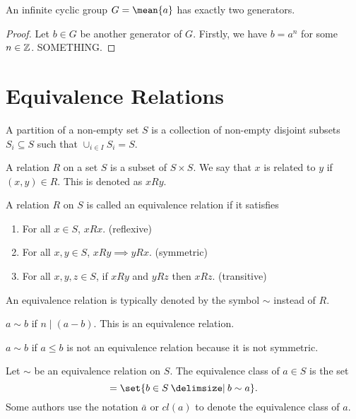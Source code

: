 \documentclass[11pt]{penrose}
\newcommand{\cyclic}[1]{\mean{#1}}
\begin{document}
\begin{nthm}
    An infinite cyclic group $G = \cyclic{a}$ has exactly two generators.
\end{nthm}
\begin{proof}
    Let $b \in G$ be another generator of $G$. Firstly, we have $b = a^n$ for some $n \in \mathbb{Z}$. SOMETHING.
\end{proof}

\section{Equivalence Relations}
\begin{ndfn}
    A partition of a non-empty set $S$ is a collection of non-empty disjoint subsets $S_i \subseteq S$ such that $\cup_{i \in I} S_i = S$.
\end{ndfn}

\begin{ndfn}
    A relation $R$ on a set $S$ is a subset of $S \times S$. We say that $x$ is related to $y$ if $(x,y) \in R$. This is denoted as $xRy$.
\end{ndfn}

\begin{ndfn}
    A relation $R$ on $S$ is called an equivalence relation if it satisfies
    \begin{enumerate}[label=(\roman*)]
        \item For all $x \in S$, $xRx$. \hfill(reflexive)
        \item For all $x, y \in S$, $xRy \implies yRx$. \hfill(symmetric)
        \item For all $x, y, z \in S$, if $xRy$ and $yRz$ then $xRz$. \hfill(transitive)
    \end{enumerate}
    An equivalence relation is typically denoted by the symbol $\sim$ instead of $R$.
\end{ndfn}

\begin{negg}
    $a \sim b$ if $n \mid (a-b)$. This is an equivalence relation.
\end{negg}

\begin{negg}
    $a \sim b$ if $a \leq b$ is not an equivalence relation because it is not symmetric.
\end{negg}

\begin{ndfn}
    Let $\sim$ be an equivalence relation on $S$. The equivalence class of $a \in S$ is the set
    \begin{equation}
        [a] = \set{b \in S \st b \sim a}.
    \end{equation}
    Some authors use the notation $\bar{a}$ or $cl(a)$ to denote the equivalence class of $a$.
\end{ndfn}
\end{document}
